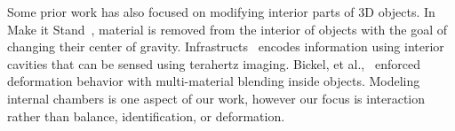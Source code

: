 
Some prior work has also focused on modifying interior parts of 3D objects. 
In Make it Stand~\cite{Prevost-makeitstand}, material is removed from the interior of objects with the goal of changing their center of gravity. Infrastructs~\cite{Willis-infrastructs} encodes information using interior cavities that can be sensed using terahertz imaging. Bickel, et al.,~\cite{Bickel-deformation} enforced deformation behavior with multi-material blending inside objects. Modeling internal chambers is one aspect of our work, however our focus is interaction rather than balance, identification, or deformation.  
